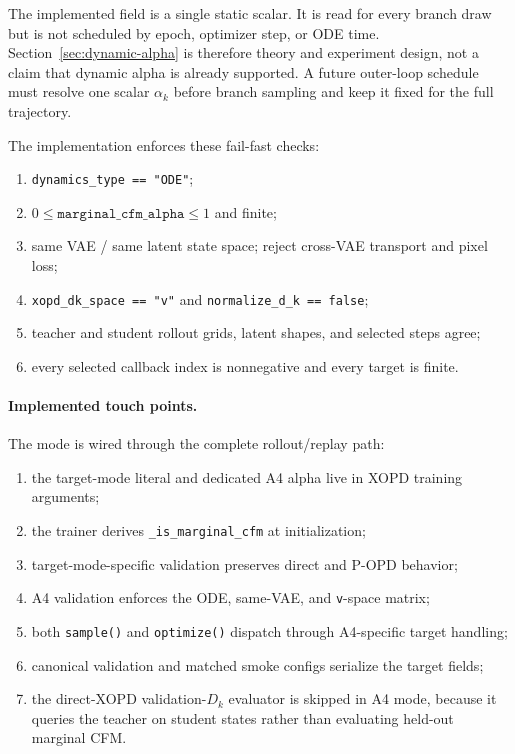 \documentclass[11pt,a4paper]{article}
\theoremstyle{plain}
\theoremstyle{definition}
\begin{document}
The implemented field is a single static scalar.  It is read for every branch draw but is not
scheduled by epoch, optimizer step, or ODE time.  Section~\ref{sec:dynamic-alpha} is therefore
theory and experiment design, not a claim that dynamic alpha is already supported.  A future
outer-loop schedule must resolve one scalar $\alpha_k$ before branch sampling and keep it fixed
for the full trajectory.

The implementation enforces these fail-fast checks:
\begin{enumerate}[leftmargin=1.6em]
\item \texttt{dynamics\_type == "ODE"};
\item $0\le\texttt{marginal\_cfm\_alpha}\le1$ and finite;
\item same VAE / same latent state space; reject cross-VAE transport and pixel loss;
\item \texttt{xopd\_dk\_space == "v"} and \texttt{normalize\_d\_k == false};
\item teacher and student rollout grids, latent shapes, and selected steps agree;
\item every selected callback index is nonnegative and every target is finite.
\end{enumerate}

\paragraph{Implemented touch points.}
The mode is wired through the complete rollout/replay path:
\begin{enumerate}[leftmargin=1.6em]
\item the target-mode literal and dedicated A4 alpha live in XOPD training arguments;
\item the trainer derives \texttt{\_is\_marginal\_cfm} at initialization;
\item target-mode-specific validation preserves direct and P-OPD behavior;
\item A4 validation enforces the ODE, same-VAE, and \texttt{v}-space matrix;
\item both \texttt{sample()} and \texttt{optimize()} dispatch through A4-specific target handling;
\item canonical validation and matched smoke configs serialize the target fields;
\item the direct-XOPD validation-$D_k$ evaluator is skipped in A4 mode, because it
      queries the teacher on student states rather than evaluating held-out marginal CFM.
\end{enumerate}
\end{document}
